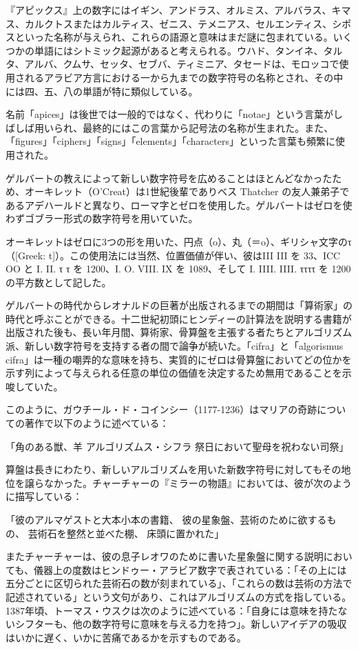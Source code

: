 \documentclass[a4paper,11pt,openany]{ltjsbook}
\begin{document}
『アピックス』上の数字にはイギン、アンドラス、オルミス、アルバラス、キマス、カルクトスまたはカルティス、ゼニス、テメニアス、セルエンティス、シポスといった名称が与えられ、これらの語源と意味はまだ謎に包まれている。いくつかの単語にはシトミック起源があると考えられる。ウハド、タンイネ、タルタ、アルバ、クムサ、セッタ、セブバ、ティミニア、タセードは、モロッコで使用されるアラビア方言における一から九までの数字符号の名称とされ、その中には四、五、八の単語が特に類似している。

名前「apices」は後世では一般的ではなく、代わりに「notae」という言葉がしばしば用いられ、最終的にはこの言葉から記号法の名称が生まれた。また、「figures」「ciphers」「signs」「elements」「characters」といった言葉も頻繁に使用された。

ゲルバートの教えによって新しい数字符号を広めることはほとんどなかったため、オーキレット（O'Creat）は1世紀後輩でありベス Thatcher の友人兼弟子であるアデハールドと異なり、ローマ字とゼロを使用した。ゲルバートはゼロを使わずゴブラー形式の数字符号を用いていた。

オーキレットはゼロに3つの形を用いた、円点（o）、丸（＝o）、ギリシャ文字のτ（[Greek: t]）。この使用法には当然、位置価値が伴い、彼はIII III を 33、ICC OO と I. II. τ τ を 1200、I. O. VIII. IX を 1089、そして I. IIII. IIII. ττττ を 1200 の平方数として記した。

ゲルバートの時代からレオナルドの巨著が出版されるまでの期間は「算術家」の時代と呼ぶことができる。十二世紀初頭にヒンディーの計算法を説明する書籍が出版された後も、長い年月間、算術家、骨算盤を主張する者たちとアルゴリズム派、新しい数字符号を支持する者の間で論争が続いた。「cifra」と「algorismus cifra」は一種の嘲弄的な意味を持ち、実質的にゼロは骨算盤においてどの位かを示す列によって与えられる任意の単位の価値を決定するため無用であることを示唆していた。

このように、ガウチール・ド・コインシー（1177-1236）はマリアの奇跡についての著作で以下のように述べている：

「角のある獣、羊
  アルゴリズムス・シフラ
  祭日において聖母を祝わない司祭」

算盤は長きにわたり、新しいアルゴリズムを用いた新数字符号に対してもその地位を譲らなかった。チャーチャーの『ミラーの物語』においては、彼が次のように描写している：

「彼のアルマゲストと大本小本の書籍、
  彼の星象盤、芸術のために欲するもの、
  芸術石を整然と並べた棚、
  床頭に置かれた」

またチャーチャーは、彼の息子レオワのために書いた星象盤に関する説明においても、儀器上の度数はヒンドゥー・アラビア数字で表されている：「その上には五分ごとに区切られた芸術石の数が刻まれている」、「これらの数は芸術の方法で記述されている」という文句があり、これはアルゴリズムの方式を指している。1387年頃、トーマス・ウスクは次のように述べている：「自身には意味を持たないシフターも、他の数字符号に意味を与える力を持つ」。新しいアイデアの吸収はいかに遅く、いかに苦痛であるかを示すものである。
\end{document}

